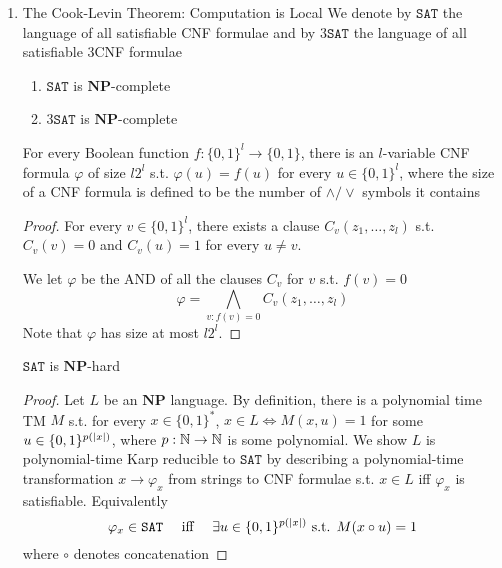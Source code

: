 \documentclass[11pt]{article}
\def \NP {\textbf{NP}}
\def \SAT {\text{SAT}}
\def \NP {\textbf{NP}}
\def \SAT {\texttt{SAT}}
\begin{document}
\begin{enumerate}
\item The Cook-Levin Theorem: Computation is Local
\label{sec:orge2eb3b8}
We denote by \(\SAT\) the language of all satisfiable CNF formulae and by \(3\SAT\) the
language of all satisfiable 3CNF formulae

\begin{theorem}
\label{thm2.10}
\begin{enumerate}
\item \(\SAT\) is \(\NP\)-complete
\item \(3\SAT\) is \(\NP\)-complete
\end{enumerate}
\end{theorem}

\begin{lemma}
\label{lemma2.13}
For every Boolean function \(f:\{0,1\}^l\to\{0,1\}\), there is an \(l\)-variable CNF formula \(\varphi\)
of size \(l2^l\) s.t. \(\varphi(u)=f(u)\) for every \(u\in\{0,1\}^l\), where the size of a CNF
formula is defined to be the number of \(\wedge/\vee\) symbols it contains
\end{lemma}

\begin{proof}
For every \(v\in\{0,1\}^l\), there exists a clause \(C_v(z_1,\dots,z_l)\) s.t. \(C_v(v)=0\)
and \(C_v(u)=1\) for every \(u\neq v\).

We let \(\varphi\) be the AND of all the clauses \(C_v\) for \(v\) s.t. \(f(v)=0\)
     \begin{equation*}
\varphi=\bigwedge_{v:f(v)=0}C_v(z_1,\dots,z_l)
     \end{equation*}
Note that \(\varphi\) has size at most \(l2^l\).
\end{proof}

\begin{lemma}[]
\(\SAT\) is \(\NP\)-hard
\end{lemma}

\begin{proof}
Let \(L\) be an \(\NP\) language. By definition, there is a polynomial time TM \(M\) s.t. for
every \(x\in\{0,1\}^*\), \(x\in L\Leftrightarrow M(x,u)=1\) for
some \(u\in\{0,1\}^{p(\abs{x})}\), where \(p:\mathbb{N}\to\mathbb{N}\) is some polynomial. We show \(L\) is
polynomial-time Karp reducible to \(\SAT\) by describing a polynomial-time
transformation \(x\to\varphi_x\) from strings to CNF formulae s.t. \(x\in L\) iff \(\varphi_x\)
is satisfiable. Equivalently
     \begin{equation*}
\varphi_x\in\SAT \quad\text{ iff }\quad\exists u\in\{0,1\}^{p(\abs{x})}
\text{ s.t. }M(x\circ u)=1
     \end{equation*}
where \(\circ\) denotes concatenation


\end{proof}
\end{enumerate}
\end{document}

